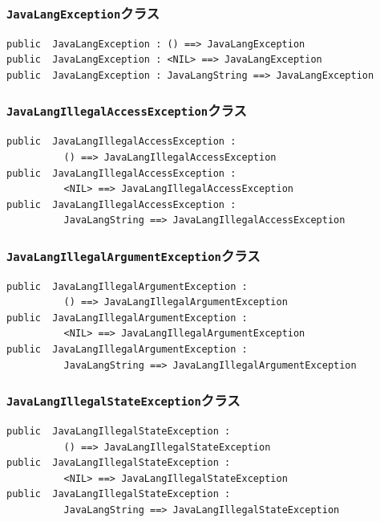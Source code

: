\documentclass[\pformat,12pt]{jarticle}
\begin{document}
\subsubsection{\texttt{JavaLangException}クラス}
\begin{small}
\begin{verbatim}
public  JavaLangException : () ==> JavaLangException
public  JavaLangException : <NIL> ==> JavaLangException
public  JavaLangException : JavaLangString ==> JavaLangException
\end{verbatim}
\end{small}

\subsubsection{\texttt{JavaLangIllegalAccessException}クラス}
\begin{small}
\begin{verbatim}
public  JavaLangIllegalAccessException : 
          () ==> JavaLangIllegalAccessException
public  JavaLangIllegalAccessException : 
          <NIL> ==> JavaLangIllegalAccessException
public  JavaLangIllegalAccessException : 
          JavaLangString ==> JavaLangIllegalAccessException
\end{verbatim}
\end{small}

\subsubsection{\texttt{JavaLangIllegalArgumentException}クラス}
\begin{small}
\begin{verbatim}
public  JavaLangIllegalArgumentException : 
          () ==> JavaLangIllegalArgumentException
public  JavaLangIllegalArgumentException : 
          <NIL> ==> JavaLangIllegalArgumentException
public  JavaLangIllegalArgumentException : 
          JavaLangString ==> JavaLangIllegalArgumentException
\end{verbatim}
\end{small}

\subsubsection{\texttt{JavaLangIllegalStateException}クラス}
\begin{small}
\begin{verbatim}
public  JavaLangIllegalStateException : 
          () ==> JavaLangIllegalStateException
public  JavaLangIllegalStateException : 
          <NIL> ==> JavaLangIllegalStateException
public  JavaLangIllegalStateException : 
          JavaLangString ==> JavaLangIllegalStateException
\end{verbatim}
\end{small}
\end{document}
